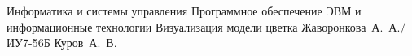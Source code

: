 \documentclass{bmstu}
\begin{document}
\makecourseworktitle
	{Информатика и системы управления}
	{Программное обеспечение ЭВМ и информационные технологии}
	{Визуализация модели цветка}
	{Жаворонкова~А.~А./ИУ7-56Б}
	{Куров~А.~В.}
	{}

\setcounter{page}{3}
\maketableofcontents

%
%








\makebibliography


\end{document}
